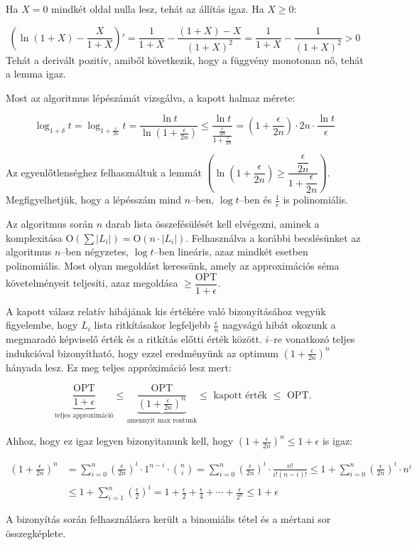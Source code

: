 Ha $X=0$ mindkét oldal nulla lesz, tehát az állítás igaz. Ha $X \geq 0$:

\[ \left( \ln{(1+X)} - \frac{X}{1+X}\right)' = \frac{1}{1+X} - \frac{(1+X)-X}{(1+X)^2} =
\frac{1}{1+X} - \frac{1}{(1+X)^2} > 0
\]
Tehát a derivált pozitív, amiből következik, hogy a függvény monotonan nő, tehát
a lemma igaz.

Most az algoritmus lépészámát vizsgálva, a kapott halmaz mérete:

\[ \log_{1+\delta}{t}=\log_{1+\frac{\epsilon}{2n} }{t} = \frac{\ln{t}}{\ln(1+\frac{\epsilon}{2n})}
\leq \frac{\ln{t}}{\frac{\frac{\epsilon}{2n}}{1+\frac{\epsilon}{2n}}}
= \left(1 + \frac{\epsilon}{2n} \right) \cdot 2n \cdot \frac{\ln{t}}{\epsilon} \]

Az egyenlőtlenséghez felhasználtuk a lemmát $\left(\ln(1+\dfrac{\epsilon}{2n})
\geq \dfrac{\dfrac{\epsilon}{2n}}{1+\dfrac{\epsilon}{2n}}\right)$.
Megfigyelhetjük, hogy a lépésszám mind $n$--ben, $\log t$--ben és
$\frac{1}{\epsilon}$ is polinomiális.

Az algoritmus során $n$ darab lista összefésülését kell elvégezni, aminek a
komplexitása O$(\sum |L_i|)=$O$(n \cdot |L_i|)$. Felhasználva a korábbi
becslésünket az algoritmus $n$--ben négyzetes, $\log{t}$--ben lineáris, azaz
mindkét esetben polinomiális. Most olyan megoldást keressünk, amely az
approximációs séma követelményeit teljesíti, azaz megoldása $\geq
\dfrac{\mbox{OPT}}{1+\epsilon}$.

A kapott válasz relatív hibájának kis értékére való bizonyításához vegyük
figyelembe, hogy $L_i$ lista ritkításakor legfeljebb $\frac{\epsilon}{n}$
nagyságú hibát okozunk a megmaradó képviselő érték és a ritkítás előtti érték
között. $i$--re vonatkozó teljes indukcióval bizonyítható, hogy ezzel
eredményünk az optimum $(1+ \frac{\epsilon}{2n})^n$ hányada lesz. Ez meg teljes
appróximáció lesz mert:

\[ \underbrace{\frac{\mbox{OPT}}{1+\epsilon}}_{\mbox{teljes approximáció}} \leq
\underbrace{\frac{\mbox{OPT}}{(1+ \frac{\epsilon}{2n})^n}}_{\mbox{amennyit max
rontunk}} \leq \mbox{ kapott érték } \leq \mbox{ OPT. }\]

Ahhoz, hogy ez igaz legyen bizonyitanunk kell, hogy $(1+\frac{\epsilon}{2n})^n
\leq 1 + \epsilon$ is igaz:

\begin{align*}
\left(1+\frac{\epsilon}{2n}\right)^n &=
\sum_{i=0}^{n}\left(\frac{\epsilon}{2n}\right)^i \cdot 1^{n-i} \cdot \binom{n}{i} =
 \sum_{i=0}^{n}\left(\frac{\epsilon}{2n}\right)^i \cdot \frac{n!}{i!(n-i)!}
 \leq 1 + \sum_{i=0}^{n}\left(\frac{\epsilon}{2n}\right)^i \cdot n^i \\
 &\leq 1 + \sum_{i=1}^{n}\left(\frac{\epsilon}{2}\right)^i = 1 + \frac{\epsilon}{2}
 + \frac{\epsilon}{4} + \cdots + \frac{\epsilon}{2^n} \leq 1 + \epsilon
\end{align*}

A bizonyítás során felhasználásra került a binomiális tétel és a mértani sor
összegképlete.
